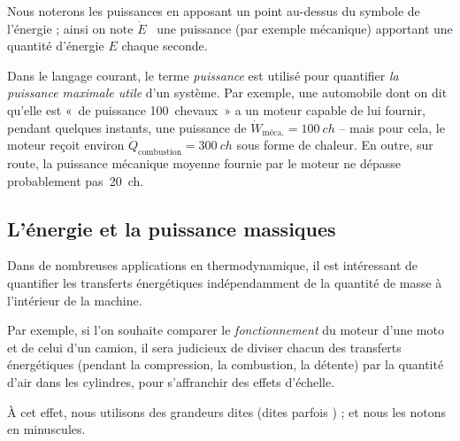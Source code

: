 		Nous noterons les puissances en apposant un point au-dessus du symbole de l’énergie ; ainsi on note $\dot{E}$ \ une puissance (par exemple mécanique) apportant une quantité d’énergie $E$ chaque seconde.

		Dans le langage courant, le terme \textit{puissance} est utilisé pour quantifier \textit{la puissance maximale utile} d’un système. Par exemple, une automobile dont on dit qu’elle est «~de puissance 100~chevaux~» a un moteur capable de lui fournir, pendant quelques instants, une puissance de $\dot W_{\text{méca.}} = \SI{100}{ch}$ -- mais pour cela, le moteur reçoit environ $\dot Q_{\text{combustion}} = \SI{300}{ch}$ sous forme de chaleur. En outre, sur route, la puissance mécanique moyenne fournie par le moteur ne dépasse probablement pas~\SI{20}{ch}.

	\subsection{L’énergie et la puissance massiques}
	\label{ch_valeurs_spécifiques}

		Dans de nombreuses applications en thermodynamique, il est intéressant de quantifier les transferts énergétiques indépendamment de la quantité de masse à l’intérieur de la machine.

		Par exemple, si l’on souhaite comparer le \emph{fonctionnement} du moteur d’une moto et de celui d’un camion, il sera judicieux de diviser chacun des transferts énergétiques (pendant la compression, la combustion, la détente) par la quantité d’air dans les cylindres, pour s’affranchir des effets d’échelle.

		À cet effet, nous utilisons des grandeurs dites  (dites parfois \mbox{}) ; et nous les notons en minuscules.

